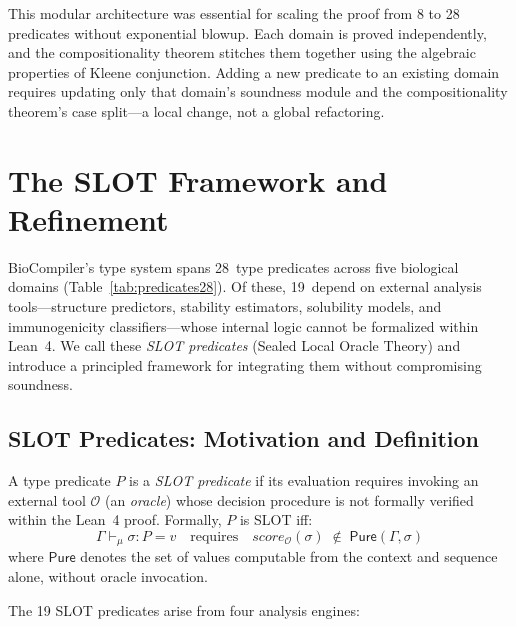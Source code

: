 \documentclass[acmsmall,review,anonymous]{acmart}
\newcommand{\seq}{\sigma}
\newcommand{\pred}{P}
\newcommand{\verdict}{v}
\newcommand{\mode}{\mu}
\newcommand{\score}{\mathit{score}}
\newcommand{\evalmode}[4]{#1 \vdash_{#2} #3 : #4}
\begin{document}
This modular architecture was essential for scaling the proof from 8
to 28 predicates without exponential blowup.
Each domain is proved independently, and the compositionality theorem
stitches them together using the algebraic properties of Kleene
conjunction.
Adding a new predicate to an existing domain requires updating only
that domain's soundness module and the compositionality theorem's
case split---a local change, not a global refactoring.


\section{The SLOT Framework and Refinement}\label{sec:slot}

BioCompiler's type system spans 28~type predicates across five
biological domains (Table~\ref{tab:predicates28}).
Of these, 19~depend on external analysis tools---structure predictors,
stability estimators, solubility models, and immunogenicity
classifiers---whose internal logic cannot be formalized within Lean~4.
We call these \emph{SLOT predicates} (Sealed Local Oracle Theory) and
introduce a principled framework for integrating them without
compromising soundness.

\subsection{SLOT Predicates: Motivation and Definition}\label{sec:slot-def}

\begin{definition}
A type predicate $\pred$ is a \emph{SLOT predicate} if its evaluation
requires invoking an external tool $\mathcal{O}$ (an \emph{oracle})
whose decision procedure is not formally verified within the Lean~4
proof. Formally, $\pred$ is SLOT iff:
\[
  \evalmode{\Gamma}{\mode}{\seq}{\pred} = \verdict
  \quad\text{requires}\quad
  \score_{\mathcal{O}}(\seq) \;\notin\; \mathsf{Pure}(\Gamma, \seq)
\]
where $\mathsf{Pure}$ denotes the set of values computable from the
context and sequence alone, without oracle invocation.
\end{definition}

The 19 SLOT predicates arise from four analysis engines:
\end{document}
